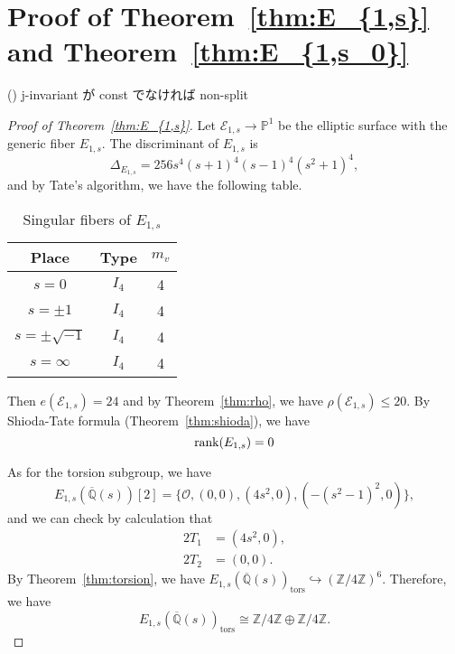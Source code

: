 \documentclass[main]{subfiles}
\begin{document}
\section{Proof of Theorem~\ref{thm:E_{1,s}} and Theorem~\ref{thm:E_{1,s_0}}}

\begin{thm}{(\cite[Exercise 3.9.]{ref:advancedaec})}
    j-invariant が const でなければ non-split
\end{thm}

\begin{proof}[Proof of Theorem~\ref{thm:E_{1,s}}]

    Let $\mathcal{E}_{1,s} \to \mathbb{P}^{1}$ be the elliptic surface with the generic fiber $E_{1,s}$.
    The discriminant of $E_{1,s}$ is
    \begin{equation}
        \label{eq:discriminant1s}
        \Delta_{E_{1,s}} = 256s^{4} (s + 1)^{4} (s - 1)^{4} (s^{2} + 1)^{4},
    \end{equation}
    and by Tate's algorithm, we have the following table.
    \begin{table}[ht]
        \centering
        \caption{Singular fibers of $E_{1,s}$}
        \begin{tabular}{|c|c|c|}
            \hline
            Place             & Type  & $m_v$ \\
            \hline
            $s=0$             & $I_4$ & 4     \\
            $s=\pm 1$         & $I_4$ & 4     \\
            $s=\pm \sqrt{-1}$ & $I_4$ & 4     \\
            $s=\infty$        & $I_4$ & 4     \\
            \hline
        \end{tabular}
    \end{table}

    Then $e(\mathcal{E}_{1,s}) = 24$ and by Theorem~\ref{thm:rho}, we have $\rho(\mathcal{E}_{1,s}) \leq 20$.
    By Shioda-Tate formula (Theorem~\ref{thm:shioda}), we have
    \begin{equation*}
        \operatorname{rank}(E_{1,s}) = 0
    \end{equation*}

    As for the torsion subgroup, we have
    \begin{equation*}
        E_{1,s}(\overline{\mathbb{Q}}(s))[2] = \{\mathcal{O}, (0,0), (4s^{2},0),( - (s^{2} - 1)^{2},0)\},
    \end{equation*}
    and we can check by calculation that
    \begin{align}
        2T_1 & = (4s^2,0), \\
        2T_2 & = (0,0).
    \end{align}
    By Theorem~\ref{thm:torsion}, we have $E_{1,s}(\overline{\mathbb{Q}}(s))_ \text{tors} \hookrightarrow (\mathbb{Z} / 4 \mathbb{Z})^{6}$.
    Therefore, we have
    \begin{equation*}
        E_{1,s}(\overline{\mathbb{Q}}(s))_ \text{tors} \cong \mathbb{Z} / 4 \mathbb{Z} \oplus \mathbb{Z} / 4 \mathbb{Z}.
    \end{equation*}
\end{proof}
\end{document}
